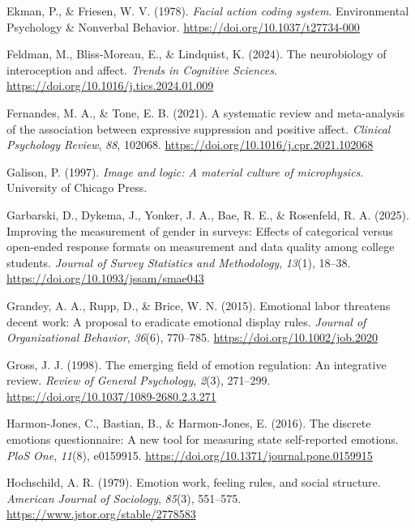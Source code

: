 \documentclass[
  letterpaper,
  DIV=11,
  numbers=noendperiod]{scrartcl}
\newlength{\cslhangindent}
\newenvironment{CSLReferences}[2] %
 {\begin{list}{}{%
  \setlength{\itemindent}{0pt}
  \setlength{\leftmargin}{0pt}
  \setlength{\parsep}{0pt}
  \ifodd #1
   \setlength{\leftmargin}{\cslhangindent}
   \setlength{\itemindent}{-1\cslhangindent}
  \fi
  \setlength{\itemsep}{#2\baselineskip}}}
 {\end{list}}
\begin{document}
\begin{CSLReferences}{1}{0}
Ekman, P., \& Friesen, W. V. (1978). \emph{Facial action coding system}.
Environmental Psychology \& Nonverbal Behavior.
\url{https://doi.org/10.1037/t27734-000}

Feldman, M., Bliss-Moreau, E., \& Lindquist, K. (2024). The neurobiology
of interoception and affect. \emph{Trends in Cognitive Sciences}.
\url{https://doi.org/10.1016/j.tics.2024.01.009}

Fernandes, M. A., \& Tone, E. B. (2021). A systematic review and
meta-analysis of the association between expressive suppression and
positive affect. \emph{Clinical Psychology Review}, \emph{88}, 102068.
\url{https://doi.org/10.1016/j.cpr.2021.102068}

Galison, P. (1997). \emph{Image and logic: A material culture of
microphysics}. University of Chicago Press.

Garbarski, D., Dykema, J., Yonker, J. A., Bae, R. E., \& Rosenfeld, R.
A. (2025). Improving the measurement of gender in surveys: Effects of
categorical versus open-ended response formats on measurement and data
quality among college students. \emph{Journal of Survey Statistics and
Methodology}, \emph{13}(1), 18--38.
\url{https://doi.org/10.1093/jssam/smae043}

Grandey, A. A., Rupp, D., \& Brice, W. N. (2015). Emotional labor
threatens decent work: A proposal to eradicate emotional display rules.
\emph{Journal of Organizational Behavior}, \emph{36}(6), 770--785.
\url{https://doi.org/10.1002/job.2020}

Gross, J. J. (1998). The emerging field of emotion regulation: An
integrative review. \emph{Review of General Psychology}, \emph{2}(3),
271--299. \url{https://doi.org/10.1037/1089-2680.2.3.271}

Harmon-Jones, C., Bastian, B., \& Harmon-Jones, E. (2016). The discrete
emotions questionnaire: A new tool for measuring state self-reported
emotions. \emph{PloS One}, \emph{11}(8), e0159915.
\url{https://doi.org/10.1371/journal.pone.0159915}

Hochschild, A. R. (1979). Emotion work, feeling rules, and social
structure. \emph{American Journal of Sociology}, \emph{85}(3), 551--575.
\url{https://www.jstor.org/stable/2778583}


\end{CSLReferences}
\end{document}
